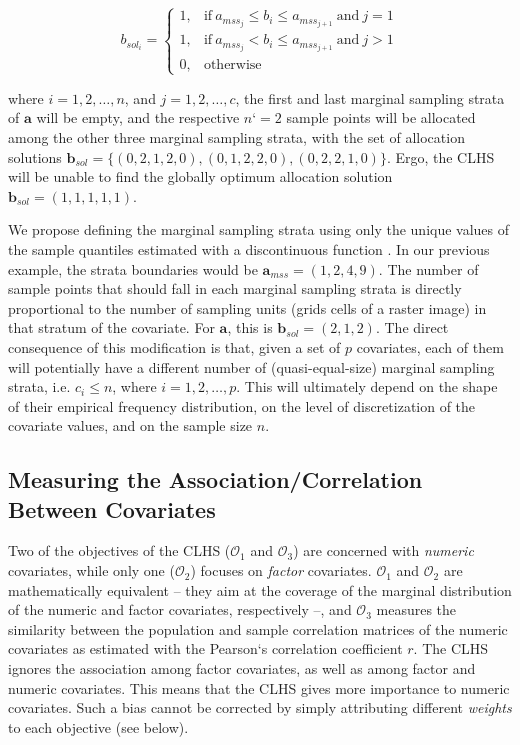 \begin{equation*}
 b_{sol_i} = 
 \begin{cases}
  1, & \text{if}\ a_{mss_j} \leq b_i \leq a_{mss_{j + 1}}\ \text{and}\ j = 1 \\ 
  1, & \text{if}\ a_{mss_j} < b_i \leq a_{mss_{j + 1}}\ \text{and}\ j > 1 \\ 
  0, & \text{otherwise}
 \end{cases}
\end{equation*}

\noindent where $i = 1, 2, \ldots, n$, and $j = 1, 2, \ldots, c$, the first and last marginal sampling strata 
of $\boldsymbol{a}$ will be empty, and the respective $n‘ = 2$ sample points will be allocated among the other 
three marginal sampling strata, with the set of allocation solutions $\boldsymbol{b}_{sol} = \{(0, 2, 1, 2, 
0), (0, 1, 2, 2, 0), (0, 2, 2, 1, 0)\}$. Ergo, the CLHS will be unable to find the globally optimum allocation 
solution $\boldsymbol{b}_{sol} = (1, 1, 1, 1, 1)$.

We propose defining the marginal sampling strata using only the unique values of the sample quantiles 
estimated with a discontinuous function \cite{HyndmanEtAl1996}. In our previous example, the strata boundaries 
would be
$\boldsymbol{a}_{mss} = (1, 2, 4, 9)$. The number of sample points that should fall in each marginal sampling 
strata is directly proportional to the number of sampling units (grids cells of a raster image) in that 
stratum of the covariate. For $\boldsymbol{a}$, this is $\boldsymbol{b}_{sol} = (2, 1, 2)$. The direct 
consequence of this modification is that, given a set of $p$ covariates, each of them will potentially have a 
different number of (quasi-equal-size) marginal sampling strata, i.e. $c_i \leq n$, where $i = 1, 2, \ldots, 
p$. This will ultimately depend on the shape of their empirical frequency distribution, on the level of 
discretization of the covariate values, and on the sample size $n$.

\subsection{Measuring the Association/Correlation Between Covariates}

Two of the objectives of the CLHS ($\mathcal{O}_1$ and $\mathcal{O}_3$) are concerned with \emph{numeric} 
covariates, while only one ($\mathcal{O}_2$) focuses on \emph{factor} covariates. $\mathcal{O}_1$ and 
$\mathcal{O}_2$ are mathematically equivalent -- they aim at the coverage of the marginal distribution of the 
numeric and factor covariates, respectively --, and $\mathcal{O}_3$ measures the similarity between the 
population and 
sample correlation matrices of the numeric covariates as estimated with the Pearson`s correlation coefficient 
$r$. The CLHS ignores the association among factor covariates, as well as among factor and numeric covariates. 
This means that the 
CLHS gives more importance to numeric covariates. Such a bias cannot be corrected by simply attributing 
different \emph{weights} to each objective (see below).

